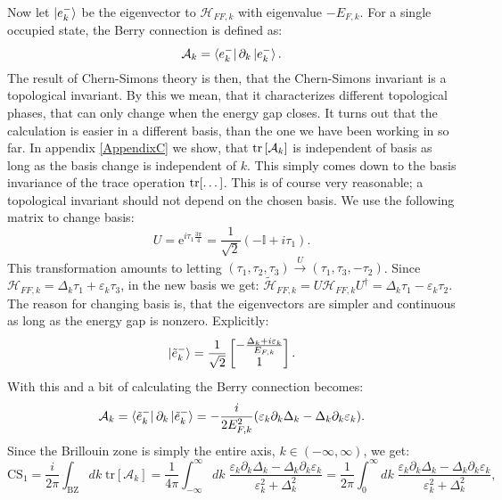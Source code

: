 Now let $\ket{e^{-}_k}$ be the eigenvector to $\mathcal{H}_{FF,k}$ with eigenvalue $-E_{F,k}$. For a single occupied state, the Berry connection is defined as:
\begin{equation}
\mathcal{A}_k = \bra{e^{-}_k}\partial_k\ket{e^{-}_k}. \nonumber
\end{equation}
The result of Chern-Simons theory is then, that the Chern-Simons invariant is a topological invariant. By this we mean, that it characterizes different topological phases, that can only change when the energy gap closes. It turns out that the calculation is easier in a different basis, than the one we have been working in so far. In appendix \ref{AppendixC} we show, that $\operatorname{tr}\left[\mathcal{A}_k\right]$ is independent of basis as long as the basis change is independent of $k$. This simply comes down to the basis invariance of the trace operation $\operatorname{tr}[\dots]$. This is of course very reasonable; a topological invariant should not depend on the chosen basis. We use the following matrix to change basis:
\begin{equation}
U = \text{e}^{i\tau_1 \frac{3\pi}{4}} = \frac{1}{\sqrt{2}}\left(-\mathbb{I} + i\tau_1\right). \nonumber 
\end{equation}
This transformation amounts to letting $(\tau_1, \tau_2, \tau_3) \overset{U}{\to} (\tau_1, \tau_3, -\tau_2)$. Since $\mathcal{H}_{FF,k} = \Delta_k\tau_1 + \varepsilon_k\tau_3$, in the new basis we get: $\tilde{\mathcal{H}}_{FF,k} = U\mathcal{H}_{FF,k}U^\dagger = \Delta_k\tau_1 - \varepsilon_k\tau_2$. The reason for changing basis is, that the eigenvectors are simpler and continuous as long as the energy gap is nonzero. Explicitly:
\begin{equation}
\ket{\tilde{e}^{-}_k} = \frac{1}{\sqrt{2}}\begin{bmatrix} -\frac{\Delta_k + i \varepsilon_k}{E_{F,k}} \\ 1 \end{bmatrix}. \nonumber 
\end{equation}
With this and a bit of calculating the Berry connection becomes:
\begin{equation}
\mathcal{A}_k = \bra{\tilde{e}^{-}_k}\partial_k\ket{\tilde{e}^{-}_k} = -\frac{i}{2E^2_{F,k}}(\varepsilon_k\partial_k\Delta_k - \Delta_k \partial_k \varepsilon_k). \nonumber 
\end{equation}
Since the Brillouin zone is simply the entire axis, $k\in (-\infty, \infty)$, we get:
\begin{equation}
\text{CS}_1 = \frac{i}{2\pi}\int_{\text{BZ}} dk\; \text{tr}\left[\mathcal{A}_k\right] = \frac{1}{4\pi}\int_{-\infty}^{\infty} dk \;  \frac{\varepsilon_k\partial_k\Delta_k - \Delta_k \partial_k \varepsilon_k}{\varepsilon^2_k + \Delta^2_k} = \frac{1}{2\pi}\int_0^\infty dk \; \frac{\varepsilon_k\partial_k\Delta_k - \Delta_k \partial_k \varepsilon_k}{\varepsilon^2_k + \Delta^2_k}, 
\label{eq.CSinv1}
\end{equation}
